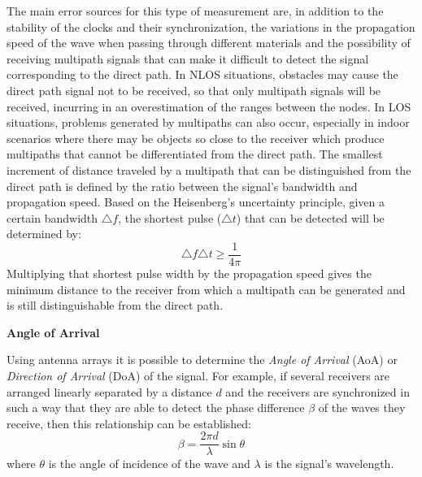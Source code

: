 \begin{description}
	The main error sources for this type of measurement are, in addition to the stability of the clocks and their synchronization, the variations in the propagation speed of the wave when passing through different materials and the possibility of receiving multipath signals that can make it difficult to detect the signal corresponding to the direct path.
	In NLOS situations, obstacles may cause the direct path signal not to be received, so that only multipath signals will be received, incurring in an overestimation of the ranges between the nodes. 
	In LOS situations, problems generated by multipaths can also occur, especially in indoor scenarios where there may be objects so close to the receiver which produce multipaths that cannot be differentiated from the direct path.
	The smallest increment of distance traveled by a multipath that can be distinguished from the direct path is defined by the ratio between the signal's bandwidth and propagation speed.	
	Based on the Heisenberg's uncertainty principle, given a certain bandwidth $\triangle f$, the shortest pulse ($\triangle t$) that can be detected will be determined by:
	\begin{equation}
	\label{eqn_heisenberg}
		\triangle f \triangle t \geqslant \frac{1}{4\pi}
	\end{equation}	
	Multiplying that shortest pulse width by the propagation speed gives the minimum distance to the receiver from which a multipath can be generated and is still distinguishable from the direct path.
	\item \textbf{Angle of Arrival}
	
	Using antenna arrays it is possible to determine the \emph{Angle of Arrival} (AoA) or \emph{Direction of Arrival} (DoA) of the signal.
	For example, if several receivers are arranged linearly separated by a distance $d$ and the receivers are synchronized in such a way that they are able to detect the phase difference $\beta$ of the waves they receive, then this relationship can be established:
	\begin{equation}
	\label{eqn_aoa}
		\beta=\frac{2 \pi d}{\lambda}\sin{\theta}
	\end{equation}
	where $\theta$ is the angle of incidence of the wave and $\lambda$ is the signal's wavelength. 
	

\end{description}
